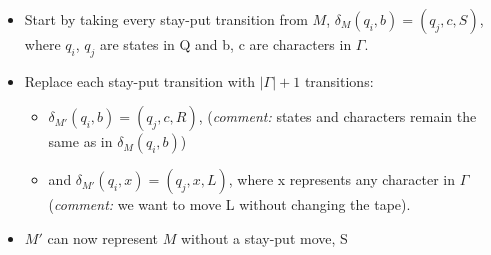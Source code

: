 \documentclass[12pt]{article}
\begin{document}
\begin{itemize}
	\begin{itemize}
	\item Start by taking every stay-put transition from $M$,  $\delta_{M}(q_{i},b) = (q_{j},c,S)$, where $q_{i}$, $q_{j}$ are states in Q and b, c are characters in $\Gamma$.
	\item Replace each stay-put transition with $|\Gamma| + 1$ transitions:
	\begin{itemize}
	  \item $\delta_{M'}(q_{i},b) = (q_{j},c,R)$, (\textit{comment:} states and characters remain the same as in $\delta_{M}(q_{i},b)$)
	  \item and $\delta_{M'}(q_{i},x) = (q_{j},x,L)$, where x represents any character in $\Gamma$ (\textit{comment:} we want to move L without changing the tape).
	\end{itemize}
	\item $M'$ can now represent $M$ without a stay-put move, S
	\end{itemize}
	\vspace{.2in}


\end{itemize}
\end{document}
